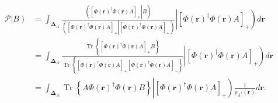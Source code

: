 \documentclass[aps,preprint]{revtex4}%
\begin{document}
\begin{align}
\mathcal{P}\left\vert B\right)   &  =\int_{\boldsymbol{\Delta}_{A}}%
\frac{\left(  \left.  \left[  \Phi\left(  \boldsymbol{r}\right)  ^{\dagger
}\Phi\left(  \boldsymbol{r}\right)  A\right]  _{+}\right\vert B\right)
}{\left(  \left.  \left[  \Phi\left(  \boldsymbol{r}\right)  ^{\dagger}%
\Phi\left(  \boldsymbol{r}\right)  A\right]  _{+}\right\vert \left[
\Phi\left(  \boldsymbol{r}\right)  ^{\dagger}\Phi\left(  \boldsymbol{r}%
\right)  A\right]  _{+}\right)  }\left\vert \left[  \Phi\left(  \boldsymbol{r}%
\right)  ^{\dagger}\Phi\left(  \boldsymbol{r}\right)  A\right]  _{+}\right)
d\boldsymbol{r}\nonumber\\
&  =\int_{\boldsymbol{\Delta}_{A}}\frac{\operatorname{Tr}\left\{  \left[
\Phi\left(  \boldsymbol{r}\right)  ^{\dagger}\Phi\left(  \boldsymbol{r}%
\right)  A\right]  _{+}B\right\}  }{\operatorname{Tr}\left\{  \left[
\Phi\left(  \boldsymbol{r}\right)  ^{\dagger}\Phi\left(  \boldsymbol{r}%
\right)  A\right]  _{+}\left[  \Phi\left(  \boldsymbol{r}\right)  ^{\dagger
}\Phi\left(  \boldsymbol{r}\right)  A\right]  _{+}\right\}  }\left\vert
\left[  \Phi\left(  \boldsymbol{r}\right)  ^{\dagger}\Phi\left(
\boldsymbol{r}\right)  A\right]  _{+}\right)  d\boldsymbol{r}\nonumber\\
&  =\int_{\boldsymbol{\Delta}_{A}}\operatorname{Tr}\left\{  A\Phi\left(
\boldsymbol{r}\right)  ^{\dagger}\Phi\left(  \boldsymbol{r}\right)  B\right\}
\left\vert \left[  \Phi\left(  \boldsymbol{r}\right)  ^{\dagger}\Phi\left(
\boldsymbol{r}\right)  A\right]  _{+}\right)  \frac{1}{\rho_{A^{2}}\left(
\boldsymbol{r}\right)  }d\boldsymbol{r}.
\end{align}
\end{document}
